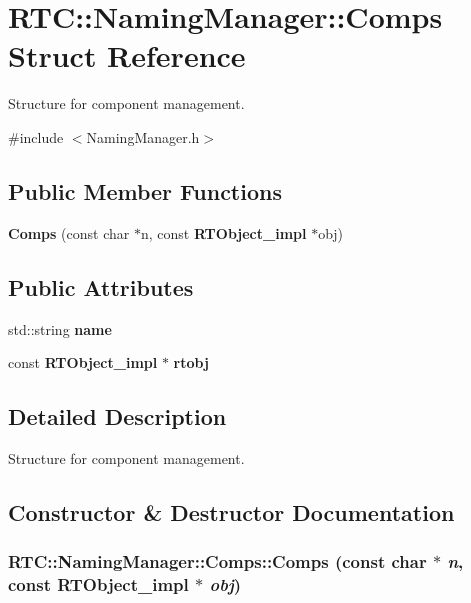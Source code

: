 \section{RTC::NamingManager::Comps Struct Reference}
\label{structRTC_1_1NamingManager_1_1Comps}


Structure for component management.  




{\ttfamily \#include $<$NamingManager.h$>$}

\subsection*{Public Member Functions}
\begin{DoxyCompactItemize}
\item 
{\bf Comps} (const char $\ast$n, const {\bf RTObject\_\-impl} $\ast$obj)
\end{DoxyCompactItemize}
\subsection*{Public Attributes}
\begin{DoxyCompactItemize}
\item 
std::string {\bf name}
\item 
const {\bf RTObject\_\-impl} $\ast$ {\bf rtobj}
\end{DoxyCompactItemize}


\subsection{Detailed Description}
Structure for component management. 

\subsection{Constructor \& Destructor Documentation}
\subsubsection[{Comps}]{\setlength{\rightskip}{0pt plus 5cm}RTC::NamingManager::Comps::Comps (const char $\ast$ {\em n}, \/  const {\bf RTObject\_\-impl} $\ast$ {\em obj})\hspace{0.3cm}{\ttfamily  [inline]}}\label{structRTC_1_1NamingManager_1_1Comps_a8a7a45790b8e3f46fa8253d2e6104bf6}


